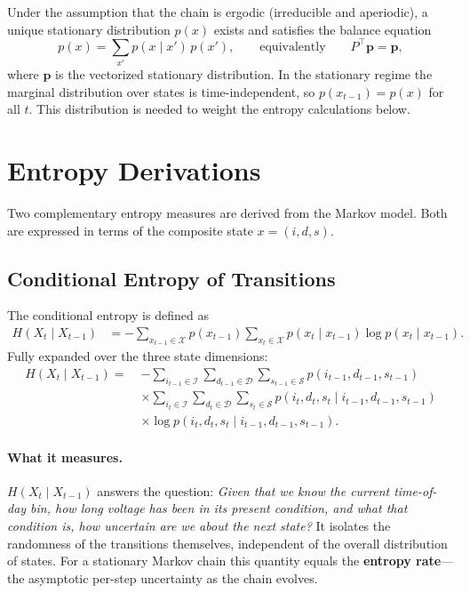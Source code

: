\documentclass[11pt]{article}
\begin{document}
Under the assumption that the chain is ergodic (irreducible and aperiodic), a unique stationary distribution $p(x)$ exists and satisfies the balance equation
\[
    p(x) = \sum_{x'} p(x \mid x')\, p(x'),
    \qquad\text{equivalently}\qquad
    P^\top \mathbf{p} = \mathbf{p},
\]
where $\mathbf{p}$ is the vectorized stationary distribution. In the stationary regime the marginal distribution over states is time-independent, so $p(x_{t-1}) = p(x)$ for all $t$. This distribution is needed to weight the entropy calculations below.


\section{Entropy Derivations}

Two complementary entropy measures are derived from the Markov model. Both are expressed in terms of the composite state $x = (i, d, s)$.

\subsection{Conditional Entropy of Transitions}

The conditional entropy is defined as
\[
\begin{aligned}
    H(X_t \mid X_{t-1})
    &= -\sum_{x_{t-1} \in \mathcal{X}} p(x_{t-1})
        \sum_{x_t \in \mathcal{X}} p(x_t \mid x_{t-1})
        \log p(x_t \mid x_{t-1}).
\end{aligned}
\]
Fully expanded over the three state dimensions:
\[
\begin{aligned}
    H(X_t \mid X_{t-1})
    = \; & -\sum_{i_{t-1} \in \mathcal{I}}
            \sum_{d_{t-1} \in \mathcal{D}}
            \sum_{s_{t-1} \in \mathcal{S}}
            p(i_{t-1}, d_{t-1}, s_{t-1}) \\
         & \times
            \sum_{i_t \in \mathcal{I}}
            \sum_{d_t \in \mathcal{D}}
            \sum_{s_t \in \mathcal{S}}
            p(i_t, d_t, s_t \mid i_{t-1}, d_{t-1}, s_{t-1}) \\
         & \times
            \log p(i_t, d_t, s_t \mid i_{t-1}, d_{t-1}, s_{t-1}).
\end{aligned}
\]

\paragraph{What it measures.}
$H(X_t \mid X_{t-1})$ answers the question: \emph{Given that we know the current time-of-day bin, how long voltage has been in its present condition, and what that condition is, how uncertain are we about the next state?} It isolates the randomness of the transitions themselves, independent of the overall distribution of states. For a stationary Markov chain this quantity equals the \textbf{entropy rate}---the asymptotic per-step uncertainty as the chain evolves.
\end{document}

